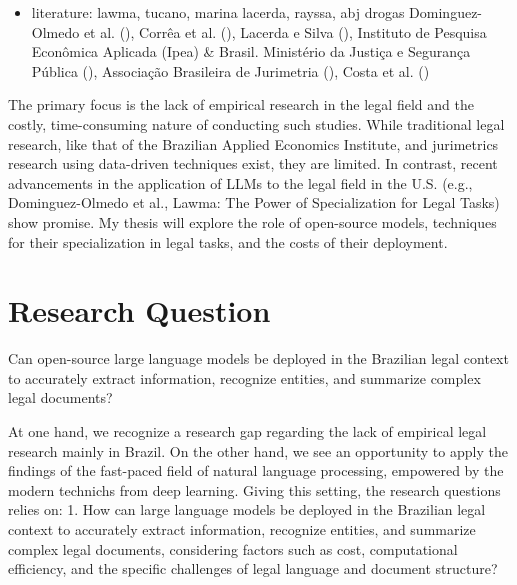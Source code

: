 \documentclass[
  12pt,
  letterpaper,
]{book}
\providecommand{\tightlist}{%
  \setlength{\itemsep}{0pt}\setlength{\parskip}{0pt}}\usepackage{longtable,booktabs,array}
\begin{document}
\begin{itemize}
\tightlist
\item
  literature: lawma, tucano, marina lacerda, rayssa, abj drogas
  Dominguez-Olmedo et al.
  (), Corrêa et al.
  (), Lacerda e Silva
  (), Instituto de
  Pesquisa Econômica Aplicada (Ipea) \& Brasil. Ministério da Justiça e
  Segurança Pública
  (),
  Associação Brasileira de Jurimetria
  (),
  Costa et al. ()
\end{itemize}

The primary focus is the lack of empirical research in the legal field
and the costly, time-consuming nature of conducting such studies. While
traditional legal research, like that of the Brazilian Applied Economics
Institute, and jurimetrics research using data-driven techniques exist,
they are limited. In contrast, recent advancements in the application of
LLMs to the legal field in the U.S. (e.g., Dominguez-Olmedo et al.,
Lawma: The Power of Specialization for Legal Tasks) show promise. My
thesis will explore the role of open-source models, techniques for their
specialization in legal tasks, and the costs of their deployment.


\chapter{Research Question}\label{research-question}

Can open-source large language models be deployed in the Brazilian legal
context to accurately extract information, recognize entities, and
summarize complex legal documents?

At one hand, we recognize a research gap regarding the lack of empirical
legal research mainly in Brazil. On the other hand, we see an
opportunity to apply the findings of the fast-paced field of natural
language processing, empowered by the modern technichs from deep
learning. Giving this setting, the research questions relies on: 1. How
can large language models be deployed in the Brazilian legal context to
accurately extract information, recognize entities, and summarize
complex legal documents, considering factors such as cost, computational
eﬀiciency, and the specific challenges of legal language and document
structure?
\end{document}
